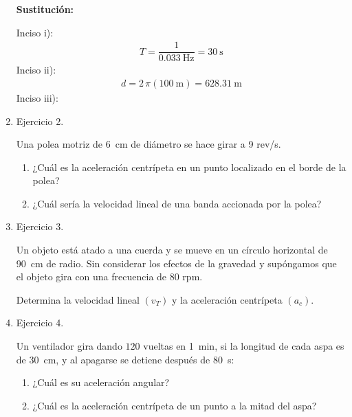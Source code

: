 \documentclass[14pt]{extarticle}
\begin{document}
\begin{enumerate}
\textbf{Sustitución:}

Inciso i):
\begin{align*}
T = \dfrac{1}{\SI{0.033}{\hertz}} = \SI{30}{\second}
\end{align*}
Inciso ii):
\begin{align*}
d = 2 \, \pi \left( \SI{100}{\meter} \right) = \SI{628.31}{\meter}
\end{align*}
Inciso iii):



\item Ejercicio 2.

Una polea motriz de \SI{6}{\centi\meter} de diámetro se hace girar a 9 rev/s.
\begin{enumerate}[label=\alph*)]
\item ¿Cuál es la aceleración centrípeta en un punto localizado en el borde de la polea?
\item ¿Cuál sería la velocidad lineal de una banda accionada por la polea?
\end{enumerate}
\item Ejercicio 3.

Un objeto está atado a una cuerda y se mueve en un círculo horizontal de \SI{90}{\centi\meter} de radio. Sin considerar los efectos de la gravedad y supóngamos que el objeto gira con una frecuencia de 80 rpm.

Determina la velocidad lineal $(v_{T})$ y la aceleración centrípeta $(a_{c})$.
\item Ejercicio 4.

Un ventilador gira dando $120$ vueltas en \SI{1}{\minute}, si la longitud de cada aspa es de \SI{30}{\centi\meter}, y al apagarse se detiene después de \SI{80}{\second}:
\begin{enumerate}[label=\roman*)]
\item ¿Cuál es su aceleración angular?
\item ¿Cuál es la aceleración centrípeta de un punto a la mitad del aspa?
\end{enumerate}
\end{enumerate}
\end{document}
